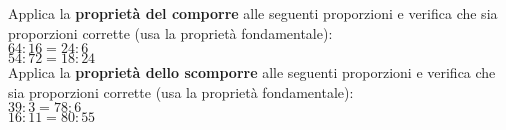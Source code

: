 \documentclass[14pt]{extarticle}
\begin{document}
Applica la \textbf{proprietà del comporre} alle seguenti proporzioni e verifica che sia proporzioni corrette (usa la proprietà fondamentale):\\
\(64:16=24:6\)\\
\(54:72=18:24\)\\

Applica la \textbf{proprietà dello scomporre} alle seguenti proporzioni e verifica che sia proporzioni corrette (usa la proprietà fondamentale):\\
\(39:3=78:6\)\\
\(16:11=80:55\)\\
\end{document}
